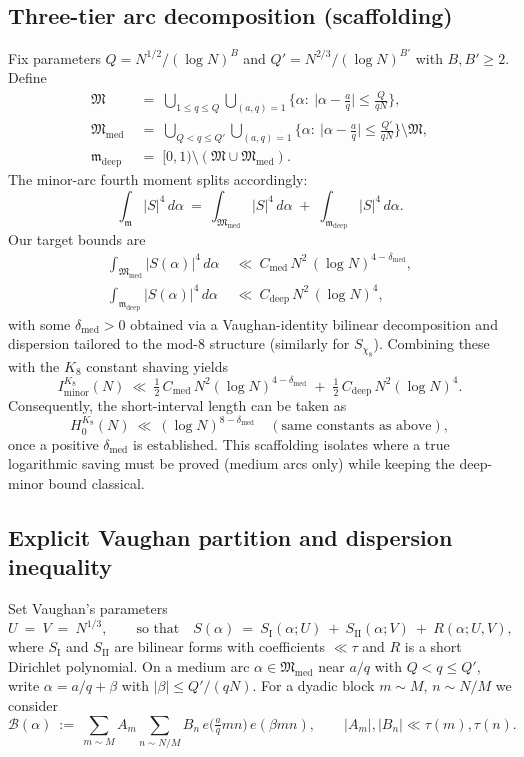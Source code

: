 \documentclass[11pt]{article}
\theoremstyle{definition}
\theoremstyle{remark}
\begin{document}
\subsection*{Three-tier arc decomposition (scaffolding)}
Fix parameters $Q=N^{1/2}/(\log N)^B$ and $Q'=N^{2/3}/(\log N)^{B'}$ with $B,B'\ge 2$. Define
\begin{align*}
\mathfrak M\;&=\;\bigcup_{1\le q\le Q}\bigcup_{(a,q)=1}\Big\{\alpha:\ \Big|\alpha-\tfrac{a}{q}\Big|\le \tfrac{Q}{qN}\Big\},\\
\mathfrak M_{\mathrm{med}}\;&=\;\bigcup_{Q< q\le Q'}\bigcup_{(a,q)=1}\Big\{\alpha:\ \Big|\alpha-\tfrac{a}{q}\Big|\le \tfrac{Q'}{qN}\Big\}\setminus\mathfrak M,\\
\mathfrak m_{\mathrm{deep}}\;&=\;[0,1)\setminus(\mathfrak M\cup\mathfrak M_{\mathrm{med}}).
\end{align*}
The minor-arc fourth moment splits accordingly:
\[
\int_{\mathfrak m}|S|^4\,d\alpha\ =\ \int_{\mathfrak M_{\mathrm{med}}}|S|^4\,d\alpha\;{+}\;\int_{\mathfrak m_{\mathrm{deep}}}|S|^4\,d\alpha.
\]
Our target bounds are
\begin{align*}
\int_{\mathfrak M_{\mathrm{med}}}|S(\alpha)|^4\,d\alpha\;&\ll\ C_{\mathrm{med}}\,N^2\,(\log N)^{4-\delta_{\mathrm{med}}},\\
\int_{\mathfrak m_{\mathrm{deep}}}|S(\alpha)|^4\,d\alpha\;&\ll\ C_{\mathrm{deep}}\,N^2\,(\log N)^4,
\end{align*}
with some $\delta_{\mathrm{med}}>0$ obtained via a Vaughan-identity bilinear decomposition and dispersion tailored to the mod-8 structure (similarly for $S_{\chi_8}$). Combining these with the $K_8$ constant shaving yields
\[
I_{\mathrm{minor}}^{K_8}(N)\ \ll\ \tfrac12\,C_{\mathrm{med}}\,N^2(\log N)^{4-\delta_{\mathrm{med}}}\;{+}\;\tfrac12\,C_{\mathrm{deep}}\,N^2(\log N)^4.
\]
Consequently, the short-interval length can be taken as
\[
H_0^{K_8}(N)\ \ll\ (\log N)^{8-\delta_{\mathrm{med}}}\quad (\text{same constants as above}),
\]
once a positive $\delta_{\mathrm{med}}$ is established. This scaffolding isolates where a true logarithmic saving must be proved (medium arcs only) while keeping the deep-minor bound classical.

\subsection*{Explicit Vaughan partition and dispersion inequality}
Set Vaughan’s parameters
\[
U\ =\ V\ =\ N^{1/3},\qquad\text{so that}\quad S(\alpha)\ =\ S_{\mathrm{I}}(\alpha;U)\ +\ S_{\mathrm{II}}(\alpha;V)\ +\ R(\alpha;U,V),
\]
where $S_{\mathrm{I}}$ and $S_{\mathrm{II}}$ are bilinear forms with coefficients $\ll \tau$ and $R$ is a short Dirichlet polynomial. On a medium arc $\alpha\in\mathfrak M_{\mathrm{med}}$ near $a/q$ with $Q<q\le Q'$, write $\alpha=a/q+\beta$ with $|\beta|\le Q'/(qN)$. For a dyadic block $m\sim M$, $n\sim N/M$ we consider
\[
\mathcal B(\alpha)\ :=\ \sum_{m\sim M} A_m\sum_{n\sim N/M} B_n\,e\!\Big(\tfrac{a}{q}mn\Big)\,e(\beta mn),\qquad |A_m|,|B_n|\ll \tau(m),\tau(n).
\]
\end{document}
